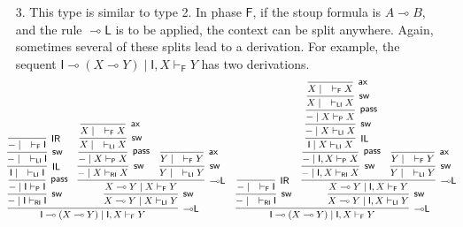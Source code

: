 \documentclass[copyright,creativecommons]{eptcs}
\theoremstyle{definition}
\newcommand{\lleft}{{\multimap}\mathsf{L}}
\newcommand{\pass}{\mathsf{pass}}
\newcommand{\unitl}{\mathsf{IL}}
\newcommand{\unitr}{\mathsf{IR}}
\newcommand{\ax}{\mathsf{ax}}
\newcommand{\lolli}{\multimap}
\newcommand{\I}{\mathsf{I}}
\newcommand{\RI}{\mathsf{RI}}
\newcommand{\LI}{\mathsf{LI}}
\newcommand{\Pass}{\mathsf{P}}
\newcommand{\F}{\mathsf{F}}
\begin{document}
\begin{enumerate}
\item[3.] This type is similar to type 2. In phase $\F$, if the stoup formula is $A \lolli B$, and the rule $\lleft$ is to be applied, the context can be split anywhere. Again, sometimes several of these splits lead to a derivation.
 For example, the sequent $\I \lolli (X \lolli Y) \mid \I , X \vdash_{\F} Y$ has two derivations.
\begin{equation*}
\small
\hspace*{-5mm}
  \begin{array}{cc}
    \infer[\lleft]{\I \lolli (X \lolli Y) \mid \I , X \vdash_{\F} Y}{
      \infer[\mathsf{sw}]{{-} \mid \I \vdash_{\RI} \I}{
        \infer[\pass]{{-} \mid \I \vdash_{\Pass} \I}{
          \infer[\unitl]{\I \mid \quad \vdash_{\LI} \I}{
            \infer[\mathsf{sw}]{{-} \mid \quad \vdash_{\LI} \I}{
              \infer[\unitr]{{-} \mid \quad \vdash_{\F} \I}{}
            }
          }
        }
      }
      &
      \infer[\mathsf{sw}]{X \lolli Y \mid X \vdash_{\LI} Y}{
        \infer[\lleft]{X \lolli Y \mid X \vdash_{\F} Y}{
          \infer[\mathsf{sw}]{{-} \mid X \vdash_{\RI} X}{
            \infer[\pass]{{-} \mid X \vdash_{\Pass} X}{
              \infer[\mathsf{sw}]{X \mid \quad \vdash_{\LI} X}{
                \infer[\ax]{X \mid \quad \vdash_{\F} X}{}
              }
            }
          }
          &
          \infer[\mathsf{sw}]{Y \mid \quad \vdash_{\LI} Y}{
            \infer[\ax]{Y \mid \quad \vdash_{\F} Y}{}
          }
        }
      }
    }
    &
    \infer[\lleft]{\I \lolli (X \lolli Y) \mid \I , X \vdash_{\F} Y}{
      \infer[\mathsf{sw}]{{-} \mid \quad \vdash_{\RI} \I}{
        \infer[\unitr]{{-} \mid \quad \vdash_{\F} \I}{}
      }
      &
      \infer[\mathsf{sw}]{X \lolli Y \mid \I , X \vdash_{\LI} Y}{
        \infer[\lleft]{X \lolli Y \mid \I , X \vdash_{\F} Y}{
          \infer[\mathsf{sw}]{{-} \mid \I , X \vdash_{\RI} X}{
            \infer[\pass]{{-} \mid \I , X \vdash_{\Pass} X}{
              \infer[\unitl]{\I \mid X \vdash_{\LI} X}{
                \infer[\mathsf{sw}]{{-} \mid X \vdash_{\LI} X}{
                  \infer[\pass]{{-} \mid X \vdash_{\Pass} X}{
                    \infer[\mathsf{sw}]{X \mid \quad \vdash_{\LI} X}{
                      \infer[\ax]{X \mid \quad \vdash_{\F} X}{}
                    }
                  }
                }
              }
            }
          }
          &
          \infer[\mathsf{sw}]{Y \mid \quad \vdash_{\LI} Y}{
            \infer[\ax]{Y \mid \quad \vdash_{\F} Y}{}
          }
            }
}}
\end{array}
\end{equation*}
\end{enumerate}
\end{document}
